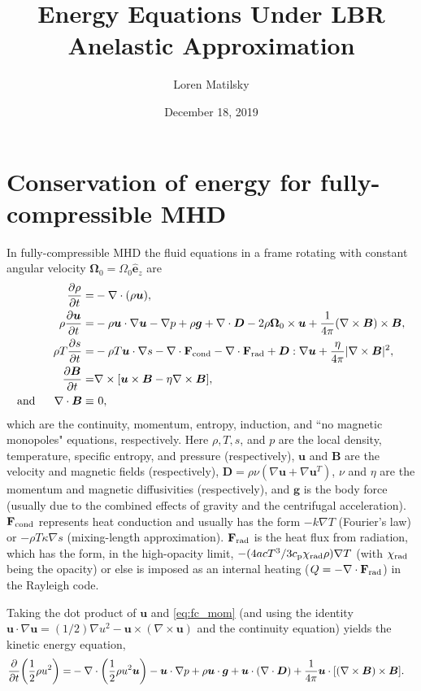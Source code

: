 \documentclass[12pt]{article} %
\date{December 18, 2019}
\author{Loren Matilsky}
\title{Energy Equations Under LBR Anelastic Approximation}
\newcommand{\pderiv}[2]{\frac{\partial#1}{\partial#2}}
\newcommand{\five}{\ \ \ \ \ }
\newcommand{\e}{\hat{\bm{e}}}
\newcommand{\curl}{\nabla\times}
\newcommand{\Div}{\nabla\cdot}
\begin{document}
	\maketitle
	\section{Conservation of energy for fully-compressible MHD}
	In fully-compressible MHD the fluid equations in a frame rotating with constant angular velocity $\bm{\Omega}_0=\Omega_0\e_z$ are
	\begin{align}
	\pderiv{\rho}{t}= &-\nabla\cdot(\rho\bm{u}),\label{eq:fc_cont}\\
	\rho\pderiv{\bm{u}}{t} = &- \rho\bm{u}\cdot\nabla\bm{u} - \nabla p + \rho\bm{g} + \Div\bm{D} - 2\rho\bm{\Omega}_0\times\bm{u} + \frac{1}{4\pi}(\curl{\bm{B}})\times\bm{B},\label{eq:fc_mom}\\
	\rho T \pderiv{s}{t} = &-\rho T\bm{u}\cdot\nabla s  - \nabla\cdot\mathbf{F}_{\rm{cond}} -\nabla\cdot\mathbf{F}_{\rm{rad}}  + \bm{D}:\nabla\bm{u} + \frac{\eta}{4\pi}|\curl\bm{B}|^2,\label{eq:fc_ent}\\
	\five\pderiv{\bm{B}}{t} = &\curl[\bm{u}\times\bm{B}-\eta\curl\bm{B}]\label{eq:fc_ind},\\
	\text{and}\five\Div\bm{B} \equiv &\ 0,
	\end{align}
	which are the continuity, momentum, entropy, induction, and ``no magnetic monopoles" equations, respectively. Here $\rho,T,s$, and $p$ are the local density, temperature, specific entropy, and pressure (respectively), $\bm{u}$ and $\bm{B}$ are the velocity and magnetic fields (respectively), $\bm{D} = \rho\nu (\nabla\bm{u} + \nabla\bm{u}^T)$, $\nu$ and $\eta$ are the momentum and magnetic diffusivities (respectively), and $\bm{g}$ is the body force (usually due to the combined effects of gravity and the centrifugal acceleration). $\mathbf{F}_{\rm{cond}}$ represents heat conduction and usually has the form $- k\nabla T$ (Fourier's law) or $-\rho T \kappa \nabla s$ (mixing-length approximation). $\mathbf{F}_{\rm{rad}}$ is the heat flux from radiation, which has the form, in the high-opacity limit, $-(4acT^3/3c_{\rm{p}}\chi_{\rm{rad}}\rho)\nabla T$ (with $\chi_{\rm{rad}}$ being the opacity) or else is imposed as an internal heating ($Q = -\Div\mathbf{F}_{\rm{rad}}$) in the Rayleigh code. 
	
	Taking the dot product of $\bm{u}$ and \eqref{eq:fc_mom} (and using the identity $\bm{u}\cdot\nabla\bm{u} = (1/2)\nabla u^2 - \bm{u}\times(\curl\bm{u})$ and the continuity equation) yields the kinetic energy equation,
	\begin{align}
	\pderiv{}{t}\bigg{(}\frac{1}{2}\rho u^2\bigg{)} = &- \Div\bigg{(}\frac{1}{2}\rho u^2\bm{u}\bigg{)} - \bm{u}\cdot \nabla p + \rho\bm{u}\cdot\bm{g} + \bm{u}\cdot(\Div\bm{D}) + 
	\frac{1}{4\pi}\bm{u}\cdot[(\curl\bm{B})\times\bm{B}].\label{eq:fc_ke}
	\end{align}
	
\end{document}

